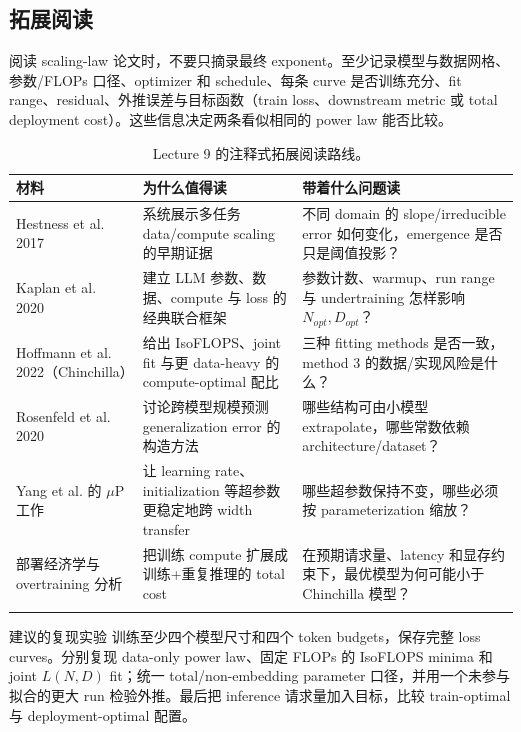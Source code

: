 \documentclass[a4paper]{article}
\begin{document}
\subsection{拓展阅读}

阅读 scaling-law 论文时，不要只摘录最终 exponent。至少记录模型与数据网格、参数/FLOPs 口径、optimizer 和 schedule、每条 curve 是否训练充分、fit range、residual、外推误差与目标函数（train loss、downstream metric 或 total deployment cost）。这些信息决定两条看似相同的 power law 能否比较。

\begin{longtable}{L{0.24\textwidth}L{0.30\textwidth}L{0.36\textwidth}}
\toprule
材料 & 为什么值得读 & 带着什么问题读 \\
\midrule
Hestness et al. 2017 & 系统展示多任务 data/compute scaling 的早期证据 & 不同 domain 的 slope/irreducible error 如何变化，emergence 是否只是阈值投影？ \\
Kaplan et al. 2020 & 建立 LLM 参数、数据、compute 与 loss 的经典联合框架 & 参数计数、warmup、run range 与 undertraining 怎样影响 $N_{opt},D_{opt}$？ \\
Hoffmann et al. 2022（Chinchilla） & 给出 IsoFLOPS、joint fit 与更 data-heavy 的 compute-optimal 配比 & 三种 fitting methods 是否一致，method 3 的数据/实现风险是什么？ \\
Rosenfeld et al. 2020 & 讨论跨模型规模预测 generalization error 的构造方法 & 哪些结构可由小模型 extrapolate，哪些常数依赖 architecture/dataset？ \\
Yang et al. 的 $\mu$P 工作 & 让 learning rate、initialization 等超参数更稳定地跨 width transfer & 哪些超参数保持不变，哪些必须按 parameterization 缩放？ \\
部署经济学与 overtraining 分析 & 把训练 compute 扩展成训练+重复推理的 total cost & 在预期请求量、latency 和显存约束下，最优模型为何可能小于 Chinchilla 模型？ \\
\bottomrule
\caption{Lecture 9 的注释式拓展阅读路线。}
\end{longtable}

\begin{importantbox}{建议的复现实验}
训练至少四个模型尺寸和四个 token budgets，保存完整 loss curves。分别复现 data-only power law、固定 FLOPs 的 IsoFLOPS minima 和 joint $L(N,D)$ fit；统一 total/non-embedding parameter 口径，并用一个未参与拟合的更大 run 检验外推。最后把 inference 请求量加入目标，比较 train-optimal 与 deployment-optimal 配置。
\end{importantbox}
\end{document}
